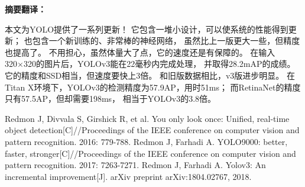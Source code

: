 \documentclass[a4paper, notitlepage]{article}
\begin{document}
\textbf{摘要翻译：}

本文为YOLO提供了一系列更新！
它包含一堆小设计，可以使系统的性能得到更新；
也包含一个新训练的、非常棒的神经网络，
虽然比上一版更大一些，但精度也提高了。
不用担心，虽然体量大了点，它的速度还是有保障的。
在输入320×320的图片后，YOLOv3能在22毫秒内完成处理，
并取得28.2mAP的成绩。它的精度和SSD相当，但速度要快上3倍。
和旧版数据相比，v3版进步明显。
在Titan X环境下，YOLOv3的检测精度为57.9AP，用时51ms；
而RetinaNet的精度只有57.5AP，但却需要198ms，
相当于YOLOv3的3.8倍。

\begin{thebibliography}{X}
Redmon J, Divvala S, Girshick R, et al. You only look once: Unified, real-time object detection[C]//Proceedings of the IEEE conference on computer vision and pattern recognition. 2016: 779-788.
Redmon J, Farhadi A. YOLO9000: better, faster, stronger[C]//Proceedings of the IEEE conference on computer vision and pattern recognition. 2017: 7263-7271. 
Redmon J, Farhadi A. Yolov3: An incremental improvement[J]. arXiv preprint arXiv:1804.02767, 2018.
\end{thebibliography}

\clearpage


\end{document}
